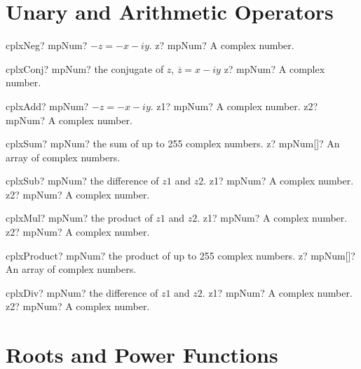 \documentclass[12pt,a4paper,openany]{book}
\begin{document}
\section{Unary and Arithmetic Operators }

\begin{mpFunctionsExtract}
\mpFunctionOne
{cplxNeg? mpNum?  $-z=-x-iy$.}
{z? mpNum? A complex number.}
\end{mpFunctionsExtract}

\begin{mpFunctionsExtract}
\mpFunctionOne
{cplxConj? mpNum? the conjugate of $z$, $\overline{z}=x-iy$}
{z? mpNum? A complex number.}
\end{mpFunctionsExtract}

\begin{mpFunctionsExtract}
\mpFunctionTwo
{cplxAdd? mpNum?  $-z=-x-iy$.}
{z1? mpNum? A complex number.}
{z2? mpNum? A complex number.}
\end{mpFunctionsExtract}

\begin{mpFunctionsExtract}
\mpFunctionOne
{cplxSum? mpNum? the sum of up to 255 complex numbers.}
{z? mpNum[]? An array of complex numbers.}
\end{mpFunctionsExtract}

\begin{mpFunctionsExtract}
\mpFunctionTwo
{cplxSub? mpNum? the difference of $z1$ and $z2$.}
{z1? mpNum? A complex number.}
{z2? mpNum? A complex number.}
\end{mpFunctionsExtract}

\begin{mpFunctionsExtract}
\mpFunctionTwo
{cplxMul? mpNum? the product of $z1$ and $z2$.}
{z1? mpNum? A complex number.}
{z2? mpNum? A complex number.}
\end{mpFunctionsExtract}

\begin{mpFunctionsExtract}
\mpFunctionOne
{cplxProduct? mpNum? the product of up to 255 complex numbers.}
{z? mpNum[]? An array of complex numbers.}
\end{mpFunctionsExtract}

\begin{mpFunctionsExtract}
\mpFunctionTwo
{cplxDiv? mpNum? the difference of $z1$ and $z2$.}
{z1? mpNum? A complex number.}
{z2? mpNum? A complex number.}
\end{mpFunctionsExtract}

\section{Roots and Power Functions}
\end{document}
